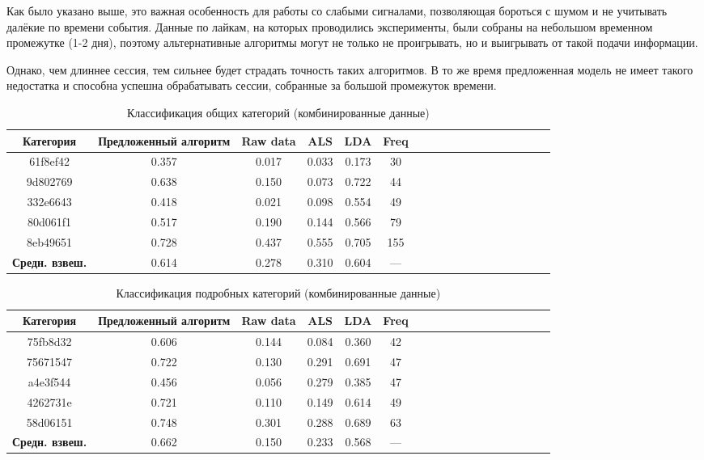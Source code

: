 \documentclass[times,specification,annotation]{itmo-student-thesis}
\begin{document}
Как было указано выше, это важная особенность для работы со слабыми сигналами, позволяющая бороться с шумом и не учитывать далёкие по времени события. Данные по лайкам, на которых проводились эксперименты, были собраны на небольшом временном промежутке (1-2 дня), поэтому альтернативные алгоритмы могут не только не проигрывать, но и выигрывать от такой подачи информации. 

Однако, чем длиннее сессия, тем сильнее будет страдать точность таких алгоритмов. В то же время предложенная модель не имеет такого недостатка и способна успешна обрабатывать сессии, собранные за большой промежуток времени.

\begin{table}[!h]
\caption{Классификация общих категорий (комбинированные данные)}\label{tab-combined-g}
\centering
\begin{tabular}{|*{18}{c|}}\hline
Категория & Предложенный алгоритм  & Raw data & ALS & LDA & Freq \\\hline
61f8ef42             & 0.357 & 0.017 & 0.033 & 0.173 & 30 \\\hline
9d802769           & 0.638 & 0.150 & 0.073 & 0.722 & 44 \\\hline
332e6643           & 0.418 & 0.021 & 0.098 & 0.554 & 49 \\\hline
80d061f1            & 0.517 & 0.190 & 0.144 & 0.566 & 79  \\\hline
8eb49651           & 0.728 & 0.437 & 0.555 & 0.705 & 155 \\\hline
\textbf{Средн. взвеш. } & 0.614 & 0.278 & 0.310 & 0.604 & --- \\\hline
\end{tabular}
\end{table}

\begin{table}[!h]
\caption{Классификация подробных категорий (комбинированные данные)}\label{tab-combined-d}
\centering
\begin{tabular}{|*{18}{c|}}\hline
Категория & Предложенный алгоритм  & Raw data & ALS & LDA & Freq \\\hline
75fb8d32            & 0.606 & 0.144 & 0.084 & 0.360 & 42 \\\hline
75671547           & 0.722 & 0.130 & 0.291 & 0.691 & 47 \\\hline
a4e3f544            & 0.456 & 0.056 & 0.279 & 0.385 & 47 \\\hline
4262731e           & 0.721 & 0.110 & 0.149 & 0.614 & 49  \\\hline
58d06151           & 0.748 & 0.301 & 0.288 & 0.689 & 63 \\\hline
\textbf{Средн. взвеш.}  & 0.662 & 0.150 & 0.233 & 0.568 & --- \\\hline
\end{tabular}
\end{table}
\end{document}
